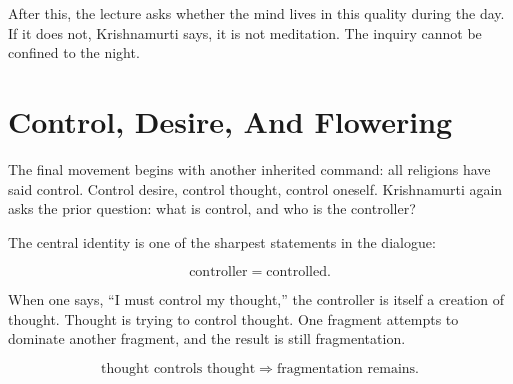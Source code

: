 \begin{figure}
\centering
{}
\end{figure}

After this, the lecture asks whether the mind lives in this quality during the day. If it does not, Krishnamurti says, it is not meditation. The inquiry cannot be confined to the night.

\section{Control, Desire, And Flowering}

The final movement begins with another inherited command: all religions have said control. Control desire, control thought, control oneself. Krishnamurti again asks the prior question: what is control, and who is the controller?

The central identity is one of the sharpest statements in the dialogue:

\begin{equation}
\text{controller} = \text{controlled}.
\end{equation}

When one says, ``I must control my thought,'' the controller is itself a creation of thought. Thought is trying to control thought. One fragment attempts to dominate another fragment, and the result is still fragmentation.

\begin{equation}
\text{thought controls thought}
\Rightarrow
\text{fragmentation remains}.
\end{equation}

